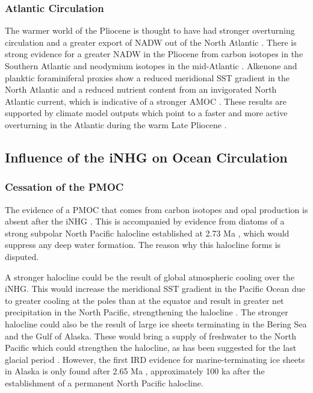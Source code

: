 \subsubsection{Atlantic Circulation}

The warmer world of the Pliocene is thought to have had stronger overturning circulation and a greater export of NADW out of the North Atlantic \citep{raymoMidPlioceneWarmthStronger1996, raveloEnhancedCirculationWarm2000}. There is strong evidence for a greater NADW in the Pliocene from carbon isotopes in the Southern Atlantic \citep{raymoResponseDeepOcean1992} and neodymium isotopes in the mid-Atlantic \citep{frenzCarbonatePreservationPatterns2006}. Alkenone and planktic foraminiferal proxies show a reduced meridional SST gradient in the North Atlantic and a reduced nutrient content from an invigorated North Atlantic current, which is indicative of a stronger AMOC \citep{naafsLatePlioceneChanges2010, karasPlioceneOceanicSeaways2017}. These results are supported by climate model outputs which point to a faster and more active overturning in the Atlantic during the warm Late Pliocene \citep{weiffenbachUnravelingMechanismsImplications2022}.

\subsection{Influence of the iNHG on Ocean Circulation}

\subsubsection{Cessation of the PMOC}

The evidence of a PMOC that comes from carbon isotopes and opal production is absent after the iNHG \citep{haugNorthPacificSeasonality2005, swannSalinityChangesNorth2010}. This is accompanied by evidence from diatoms of a strong subpolar North Pacific halocline established at 2.73 Ma \citep{swannDiatomD18OEvidence2006, studerEnhancedStratificationSeasonality2012}, which would suppress any deep water formation. The reason why this halocline forms is disputed.

A stronger halocline could be the result of global atmospheric cooling over the iNHG. This would increase the meridional SST gradient in the Pacific Ocean due to greater cooling at the poles than at the equator \citep{fedorovTightlyLinkedZonal2015} and result in greater net precipitation in the North Pacific, strengthening the halocline \citep{brierleyRelativeImportanceMeridional2010, burlsActivePacificMeridional2017}. The stronger halocline could also be the result of large ice sheets terminating in the Bering Sea and the Gulf of Alaska. These would bring a supply of freshwater to the North Pacific which could strengthen the halocline, as has been suggested for the last glacial period \citep{praetoriusRoleNortheastPacific2020}. However, the first IRD evidence for marine-terminating ice sheets in Alaska is only found after 2.65 Ma \citep{maslinProgressiveIntensificationNorthern1996}, approximately 100 ka after the establishment of a permanent North Pacific halocline.

